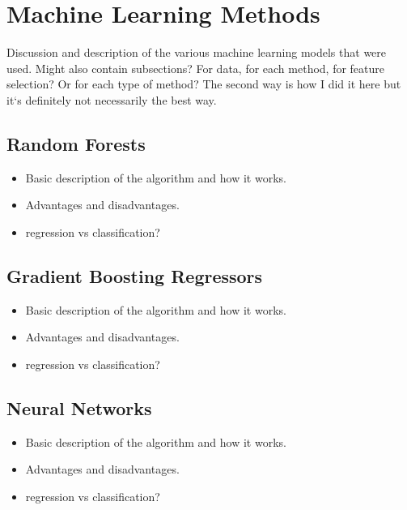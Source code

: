 \documentclass[fleqn,usenatbib]{mnras}
\begin{document}
\section{Machine Learning Methods}
Discussion and description of the various machine learning models that were used. Might also contain subsections? For data, for each method, for feature selection? Or for each type of method? The second way is how I did it here but it`s definitely not necessarily the best way. 


\subsection{Random Forests}
\label{sec:rf} %
\begin{itemize}
	\item Basic description of the algorithm and how it works.
    \item Advantages and disadvantages.
    \item regression vs classification?
\end{itemize}

\subsection{Gradient Boosting Regressors}
\label{sec:gbr} %
\begin{itemize}
	\item Basic description of the algorithm and how it works.
    \item Advantages and disadvantages.
    \item regression vs classification?
\end{itemize}

\subsection{Neural Networks}
\label{sec:nn} %
\begin{itemize}
	\item Basic description of the algorithm and how it works.
    \item Advantages and disadvantages.
    \item regression vs classification?
\end{itemize}
\end{document}

